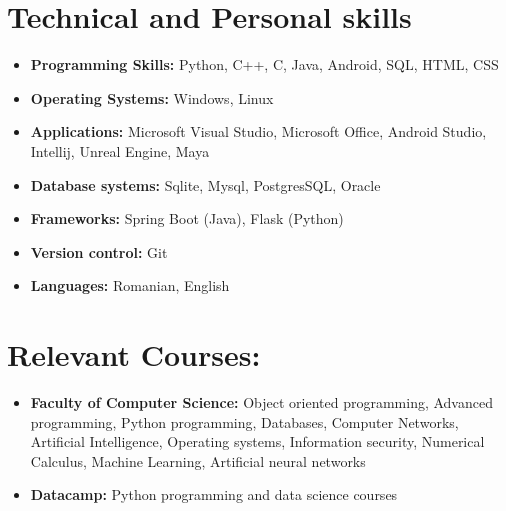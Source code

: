 \documentclass[10pt,a4paper,sans]{moderncv}
\begin{document}
	\section{Technical and Personal skills}
		\begin{itemize}

			\vspace{7pt}
			\item \textbf{Programming Skills:}  Python, C++, C, Java, Android, SQL, HTML, CSS
			
			\vspace{4pt}
			\item \textbf{Operating Systems:} Windows, Linux
			
			\vspace{4pt}
			\item \textbf{Applications:} Microsoft Visual Studio, Microsoft Office, Android Studio, Intellij, Unreal Engine, Maya
			
			\vspace{4pt}
			\item \textbf{Database systems:} Sqlite, Mysql, PostgresSQL, Oracle
			
			\vspace{4pt}
			\item \textbf{Frameworks:} Spring Boot (Java), Flask (Python)

			\vspace{4pt}
			\item \textbf{Version control:} Git
			
			\vspace{4pt}
			\item \textbf{Languages:} Romanian, English
			
		\end{itemize}
	
	\section{Relevant Courses:}
		\begin{itemize}
			\vspace{7pt}
			\item \textbf{Faculty of Computer Science: }Object oriented programming, Advanced programming, Python programming, Databases, Computer Networks, 
			Artificial Intelligence, Operating systems, Information security, Numerical Calculus, Machine Learning, Artificial neural networks
			\vspace{4pt}
			\item \textbf{Datacamp: }Python programming and data science courses
		\end{itemize}
\end{document}
